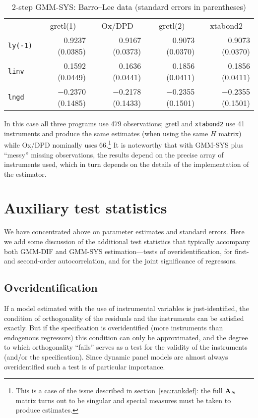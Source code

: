 \begin{table}[htbp]
\begin{center}
\begin{tabular}{lrrrr}
& \multicolumn{1}{c}{gretl(1)} & 
  \multicolumn{1}{c}{Ox/DPD} &
  \multicolumn{1}{c}{gretl(2)} & 
  \multicolumn{1}{c}{xtabond2} \\
\texttt{ly(-1)} & 0.9237 (0.0385) & 
  0.9167 (0.0373) & 
    0.9073 (0.0370) &
      0.9073 (0.0370) \\
\texttt{linv} & 0.1592 (0.0449) & 
  0.1636 (0.0441) & 
    0.1856 (0.0411) &
      0.1856 (0.0411) \\
\texttt{lngd} & $-$0.2370 (0.1485) & 
  $-$0.2178 (0.1433) & 
    $-$0.2355 (0.1501) &
      $-$0.2355 (0.1501) 
\end{tabular}
\caption{2-step GMM-SYS: Barro--Lee data (standard errors in parentheses)}
\label{tab:growth-SYS}
\end{center}
\end{table}

In this case all three programs use 479 observations; gretl and
\texttt{xtabond2} use 41 instruments and produce the same estimates
(when using the same $H$ matrix) while Ox/DPD nominally uses
66.\footnote{This is a case of the issue described in
  section~\ref{sec:rankdef}: the full $\mathbf{A}_N$ matrix turns out to be
  singular and special measures must be taken to produce estimates.}
It is noteworthy that with GMM-SYS plus ``messy'' missing
observations, the results depend on the precise array of instruments
used, which in turn depends on the details of the implementation of
the estimator.

\section{Auxiliary test statistics}
\label{sec:dpanel-aux}

We have concentrated above on parameter estimates and standard
errors. Here we add some discussion of the additional test statistics
that typically accompany both GMM-DIF and GMM-SYS estimation---tests
of overidentification, for first- and second-order autocorrelation,
and for the joint significance of regressors.

\subsection{Overidentification}

If a model estimated with the use of instrumental variables is
just-identified, the condition of orthogonality of the residuals and
the instruments can be satisfied exactly. But if the specification is
overidentified (more instruments than endogenous regressors) this
condition can only be approximated, and the degree to which
orthogonality ``fails'' serves as a test for the validity of the
instruments (and/or the specification). Since dynamic panel models are
almost always overidentified such a test is of particular importance.

